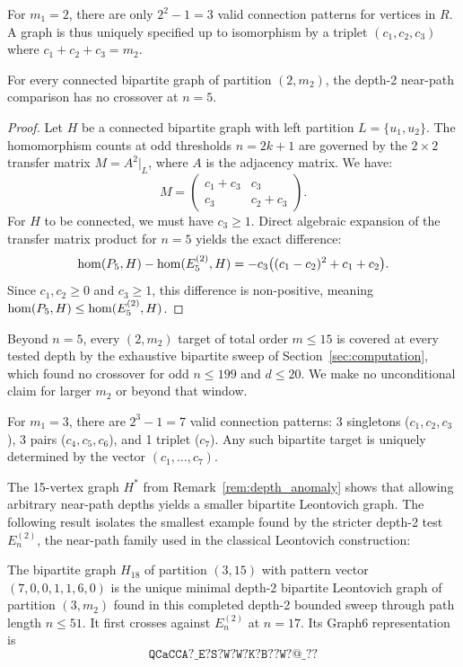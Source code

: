 For $m_1 = 2$, there are only $2^2 - 1 = 3$ valid connection patterns for
vertices in $R$. A graph is thus uniquely specified up to isomorphism by a
triplet $(c_1, c_2, c_3)$ where $c_1 + c_2 + c_3 = m_2$.

\begin{proposition}[The $n=5$ depth-2 obstruction for $m_1 = 2$]
For every connected bipartite graph of partition $(2,m_2)$, the depth-2
near-path comparison has no crossover at $n=5$.
\end{proposition}
\begin{proof}
Let $H$ be a connected bipartite graph with left partition $L = \{u_1, u_2\}$.
The homomorphism counts at odd thresholds $n=2k+1$ are governed by the $2 \times 2$ transfer matrix $M = A^2|_L$, where $A$ is the adjacency matrix. We have:
\[
  M = \begin{pmatrix} c_1+c_3 & c_3 \\ c_3 & c_2+c_3 \end{pmatrix}.
\]
For $H$ to be connected, we must have $c_3 \ge 1$. Direct algebraic expansion of the transfer matrix product for $n=5$ yields the exact difference:
\[
  \mathrm{hom}(P_5, H) - \mathrm{hom}(E_5^{(2)}, H) = -c_3 \bigl( (c_1 - c_2)^2 + c_1 + c_2 \bigr).
\]
Since $c_1, c_2 \ge 0$ and $c_3 \ge 1$, this difference is non-positive, meaning $\mathrm{hom}(P_5, H) \le \mathrm{hom}(E_5^{(2)}, H)$.

\end{proof}

Beyond $n=5$, every $(2,m_2)$ target of total order $m\le15$ is covered at
every tested depth by the exhaustive bipartite sweep of
Section~\ref{sec:computation}, which found no crossover for odd $n\le199$ and
$d\le20$. We make no unconditional claim for larger $m_2$ or beyond that
window.

For $m_1 = 3$, there are $2^3 - 1 = 7$ valid connection patterns: 3
singletons ($c_1, c_2, c_3$), 3 pairs ($c_4, c_5, c_6$), and 1 triplet ($c_7$).
Any such bipartite target is uniquely determined by the vector $(c_1, \dots,
c_7)$.

The 15-vertex graph $H^*$ from Remark~\ref{rem:depth_anomaly} shows that
allowing arbitrary near-path depths yields a smaller bipartite Leontovich graph.
The following result isolates the smallest example found by the stricter
depth-2 test $E_n^{(2)}$, the near-path family used in the classical
Leontovich construction:
\begin{compresult}
  The bipartite graph $H_{18}$ of partition $(3, 15)$ with pattern vector
  $(7, 0, 0, 1, 1, 6, 0)$ is the unique minimal depth-2 bipartite Leontovich
  graph of partition $(3, m_2)$ found in this completed depth-2 bounded sweep
  through path length $n \le 51$. It first crosses against
  $E_n^{(2)}$ at $n = 17$. Its Graph6 representation is
  \begin{equation*}
    \texttt{QCaCCA?\_E?S?W?W?K?B??W?@\_??}
  \end{equation*}
\end{compresult}

